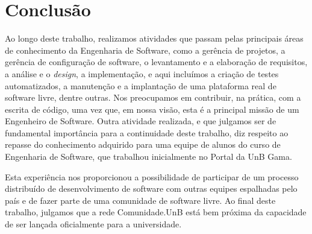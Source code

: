 \section{Conclusão}
\label{sec:conclusao}

Ao longo deste trabalho, realizamos atividades que passam
pelas principais áreas de conhecimento da Engenharia de Software, como a
gerência de projetos, a gerência de configuração de software,
o levantamento e a elaboração de requisitos, a análise e o \textit{design},
a implementação, e aqui incluímos a criação de testes automatizados,
a manutenção e a implantação de uma plataforma real de software livre, dentre
outras.
%
Nos preocupamos em contribuir, na prática, com a escrita de código,
uma vez que, em nossa visão, esta é a principal missão de um Engenheiro de
Software.
%
Outra atividade realizada, e que julgamos ser de fundamental importância para a
continuidade deste trabalho, diz respeito ao repasse do conhecimento adquirido
para uma equipe de alunos do curso de Engenharia de Software, que trabalhou
inicialmente no Portal da UnB Gama.

Esta experiência nos proporcionou a possibilidade de participar de um processo
distribuído de desenvolvimento de software com outras equipes espalhadas pelo
país e de fazer parte de uma comunidade de software livre.
%
Ao final deste trabalho, julgamos que a rede Comunidade.UnB está bem próxima
da capacidade de ser lançada oficialmente para a universidade.

